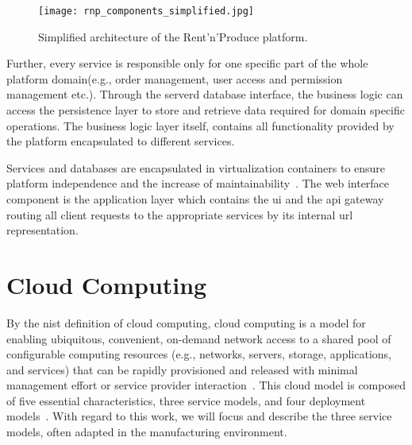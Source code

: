 \documentclass[
a4paper,
twoside,
headsepline,
cleardoublepage=empty,
parskip=half,
draft=false
]{scrbook}
\begin{document}
			\begin{figure}[htbp]
				\centering
				\texttt{[image: rnp\_components\_simplified.jpg]}
				\caption{Simplified architecture of the Rent'n'Produce platform.}
				\label{fig:rnp_architecture}
			\end{figure}

			Further, every service is responsible only for one specific part of the whole platform domain(e.g., order management, user access and permission management etc.).
			Through the serverd database interface, the business logic can access the persistence layer to store and retrieve data required for domain specific operations.
			The business logic layer itself, contains all functionality provided by the platform encapsulated to different services.

			Services and databases are encapsulated in virtualization containers to ensure platform independence and the increase of maintainability~\cite{xen.17b}.
			The web interface component is the application layer which contains the \gls{ui} and the \gls{api} gateway routing all client requests to the appropriate services by its internal \gls{url} representation.

		\section{Cloud Computing}\label{sec:cloud_computing}

			By the \gls{nist} definition of cloud computing, cloud computing is a model for enabling ubiquitous, convenient, on-demand network access to a shared pool of configurable computing resources (e.g., networks, servers, storage, applications, and services) that can be rapidly provisioned and released with minimal management effort or service provider interaction~\cite{mell2011nist}.
			This cloud model is composed of five essential characteristics, three service models, and four deployment
			models~\cite{fehling2014cloud}. With regard to this work, we will focus and describe the three service models, often adapted in the manufacturing environment.
\end{document}
